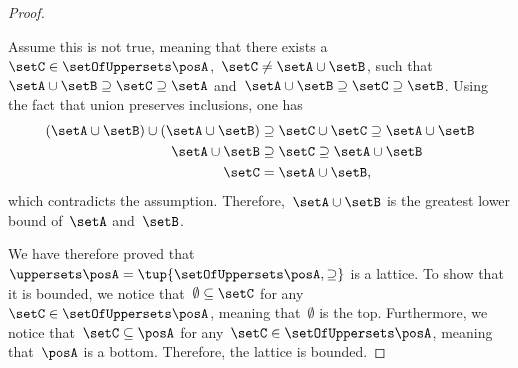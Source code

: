 \begin{proof}
\begin{itemize}
              Assume this is not true, meaning that there exists a~$\setC\in \setOfUppersets \posA$,~$\setC\neq \setA\cup \setB$, such that~$\setA\cup \setB\supseteq \setC\supseteq \setA$ and~$\setA\cup \setB\supseteq \setC\supseteq \setB$.
              Using the fact that union preserves inclusions, one has
              \begin{equation}
                  \begin{aligned}
                      (\setA\cup \setB)
                      \cup (\setA\cup \setB) & \supseteq \setC \cup \setC \supseteq \setA\cup \setB \\
                      \setA\cup \setB        & \supseteq \setC\supseteq \setA\cup \setB             \\
                      \setC                  & =\setA\cup \setB,
                  \end{aligned}
              \end{equation}
              which contradicts the assumption.
              Therefore,~$\setA\cup \setB$ is the greatest lower bound of~$\setA$ and~$\setB$.
    \end{itemize}
    We have therefore proved that~$\uppersets \posA=\tup{\setOfUppersets \posA,\supseteq}$ is a lattice.
    To show that it is bounded, we notice that~$\emptyset \subseteq \setC$ for any~$\setC\in \setOfUppersets \posA$, meaning that~$\emptyset$ is the top.
    Furthermore, we notice that~$\setC\subseteq \posA$ for any~$\setC\in \setOfUppersets \posA$, meaning that~$\posA$ is a bottom.
    Therefore, the lattice is bounded.
\end{proof}

